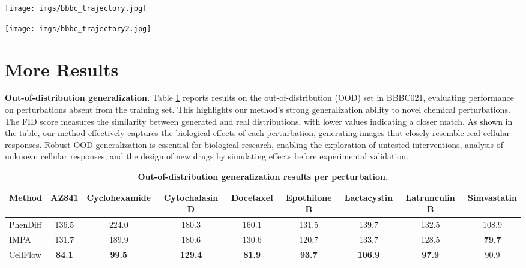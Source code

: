 \begin{figure*}[htbp]
    \centering
    \texttt{[image: imgs/bbbc\_trajectory.jpg]}
    \caption{\textbf{(1/2) Bidirectional interpolation trajectory in BBBC021.}  }
    \label{fig:bbbc_trajectory1}
\end{figure*}
\begin{figure*}[htbp]
    \centering
    \texttt{[image: imgs/bbbc\_trajectory2.jpg]}
    \caption{\textbf{(2/2) Bidirectional interpolation trajectory in BBBC021.}  }
    \label{fig:bbbc_trajectory2}
\end{figure*}


\newpage
\section{More Results}
\label{sec:results_appendix}

\textbf{Out-of-distribution generalization.} Table \ref{tab:ood_per_class} reports results on the out-of-distribution (OOD) set in BBBC021, evaluating performance on perturbations absent from the training set. This highlights our method’s strong generalization ability to novel chemical perturbations. The FID score measures the similarity between generated and real distributions, with lower values indicating a closer match. As shown in the table, our method effectively captures the biological effects of each perturbation, generating images that closely resemble real cellular responses. Robust OOD generalization is essential for biological research, enabling the exploration of untested interventions, analysis of unknown cellular responses, and the design of new drugs by simulating effects before experimental validation.

\begin{table}[htbp]
    \centering
    \setlength\tabcolsep{3pt}
    \small
    \begin{tabular}{lcccccccc}
        \toprule
        Method
        & AZ841 & Cyclohexamide & Cytochalasin D & Docetaxel & Epothilone B & Lactacystin & Latrunculin B & Simvastatin \\
        \midrule
        PhenDiff & 136.5 & 224.0 & 180.3 & 160.1 & 131.5 & 139.7 & 132.5 & 108.9 \\
        IMPA & 131.7 & 189.9 & 180.6 & 130.6 & 120.7 & 133.7 & 128.5 & \textbf{79.7} \\
        CellFlow & \textbf{84.1} & \textbf{99.5} & \textbf{129.4} & \textbf{81.9} & \textbf{93.7} & \textbf{106.9} & \textbf{97.9} & 90.9 \\
        \bottomrule
    \end{tabular}
    \caption{\textbf{Out-of-distribution generalization results per perturbation.}}
    \label{tab:ood_per_class}
\end{table}

